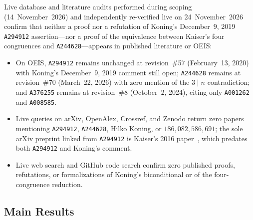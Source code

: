 \documentclass[11pt]{article}
\theoremstyle{definition}
\newcommand{\seq}[1]{\texttt{#1}}
\begin{document}
Live database and literature audits performed during scoping (14~November~2026) and independently re-verified live on 24~November~2026 confirm that neither a proof nor a refutation of Koning's December~9, 2019 \seq{A294912} assertion---nor a proof of the equivalence between Kaiser's four congruences and \seq{A244628}---appears in published literature or OEIS:
\begin{itemize}
\item On OEIS, \seq{A294912} remains unchanged at revision~\#57 (February~13, 2020) with Koning's December~9, 2019 comment still open; \seq{A244628} remains at revision~\#70 (March~22, 2026) with zero mention of the $3 \mid n$ contradiction; and \seq{A376255} remains at revision~\#8 (October~2, 2024), citing only \seq{A001262} and \seq{A008585}.
\item Live queries on arXiv, OpenAlex, Crossref, and Zenodo return zero papers mentioning \seq{A294912}, \seq{A244628}, Hilko Koning, or $186{,}082{,}586{,}691$; the sole arXiv preprint linked from \seq{A294912} is Kaiser's 2016 paper~\cite{kaiser2016}, which predates both \seq{A294912} and Koning's comment.
\item Live web search and GitHub code search confirm zero published proofs, refutations, or formalizations of Koning's biconditional or of the four-congruence reduction.
\end{itemize}

\subsection{Main Results}
\end{document}

